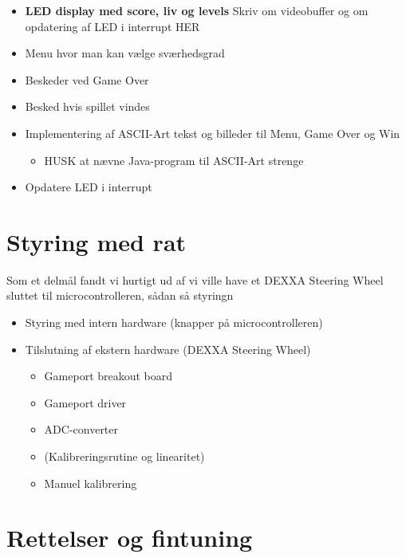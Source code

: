 \begin{itemize}
\item \textbf{LED display med score, liv og levels} Skriv om videobuffer og om opdatering af LED i interrupt HER
\item Menu hvor man kan vælge sværhedsgrad
\item Beskeder ved Game Over
\item Besked hvis spillet vindes
\item Implementering af ASCII-Art tekst og billeder til Menu, Game Over og Win
\begin{itemize}
\item HUSK at nævne Java-program til ASCII-Art strenge
\end{itemize}

\item Opdatere LED i interrupt
\end{itemize}

\section{Styring med rat}
Som et delmål fandt vi hurtigt ud af vi ville have et DEXXA Steering Wheel sluttet til microcontrolleren, sådan så styringn

\begin{itemize}
\item Styring med intern hardware (knapper på microcontrolleren)
\item Tilslutning af ekstern hardware (DEXXA Steering Wheel)
\begin{itemize}
\item Gameport breakout board

\item Gameport driver

\item ADC-converter

\item (Kalibreringsrutine og linearitet)

\item Manuel kalibrering

\end{itemize}
\end{itemize}



\section{Rettelser og fintuning}

